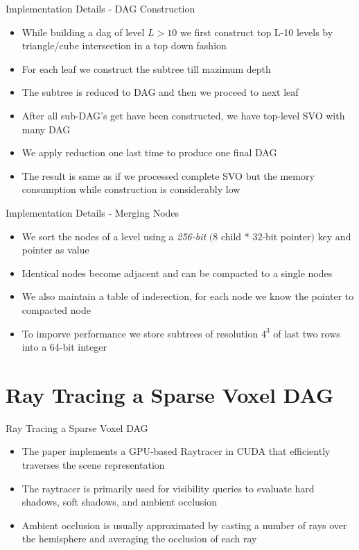 \documentclass{beamer}
\begin{document}
\begin{frame}{Implementation Details - DAG Construction}
\begin{itemize}
\item{While building a dag of level $L>10$ we first construct top L-10 levels by triangle/cube intersection in a top down fashion}
\item{For each leaf we construct the subtree till mazimum depth}
\item{The subtree is reduced to DAG and then we proceed to next leaf}
\item{After all sub-DAG's get have been constructed, we have top-level SVO with many DAG}
\item{We apply reduction one last time to produce one final DAG}
\item{The result is same as if we processed complete SVO but the memory consumption while construction is considerably low}
\end{itemize}
\end{frame}

\begin{frame}{Implementation Details - Merging Nodes}
\begin{itemize}
\item{We sort the nodes of a level using a \textit{256-bit} $($8 child * 32-bit pointer$)$ key and pointer as value}
\item{Identical nodes become adjacent and can be compacted to a single nodes}
\item{We also maintain a table of inderection, for each node we know the pointer to compacted node}
\item{To imporve performance we store subtrees of resolution $4^3$ of last two rows into a 64-bit integer}
\end{itemize}
\end{frame}

\section{Ray Tracing a Sparse Voxel DAG}

\begin{frame}{Ray Tracing a Sparse Voxel DAG}
	\begin{itemize}
	\item{The paper implements a GPU-based Raytracer in CUDA that efficiently traverses the scene representation}
	\item{The raytracer is primarily used for visibility queries to evaluate hard shadows, soft shadows, and ambient occlusion
	}
	\item{Ambient occlusion is usually approximated by casting a number
of rays over the hemisphere and averaging the occlusion of each
ray}
	
	\end{itemize}
\end{frame}
\end{document}
